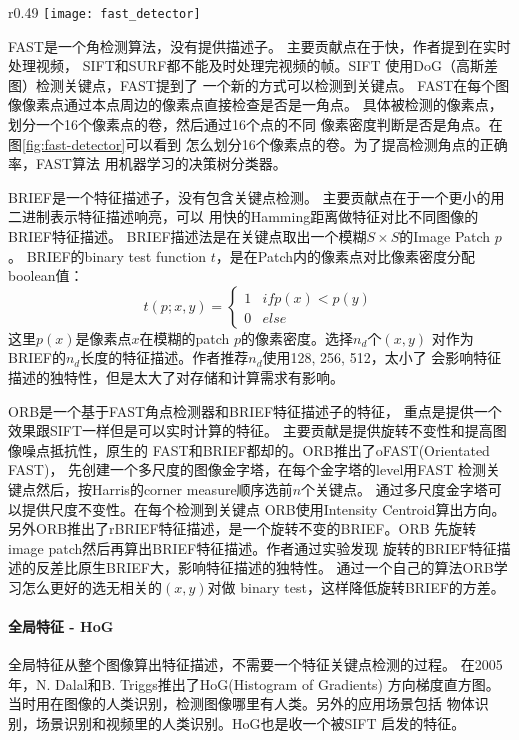 \clearpage
\begin{wrapfigure}{r}{0.49\textwidth}
  \centering
    \texttt{[image: fast\_detector]}
    \caption{FAST检测角点做法。\cite{fast2006machine}}
  \label{fig:fast-detector}
\end{wrapfigure}

FAST是一个角检测算法，没有提供描述子。
主要贡献点在于快，作者提到在实时处理视频，
SIFT和SURF都不能及时处理完视频的帧。SIFT
使用DoG（高斯差图）检测关键点，FAST提到了
一个新的方式可以检测到关键点。
FAST在每个图像像素点通过本点周边的像素点直接检查是否是一角点。
具体被检测的像素点，划分一个16个像素点的卷，然后通过16个点的不同
像素密度判断是否是角点。在图\ref{fig:fast-detector}可以看到
怎么划分16个像素点的卷。为了提高检测角点的正确率，FAST算法
用机器学习的决策树分类器。

BRIEF是一个特征描述子，没有包含关键点检测。\cite{calonder2010brief}
主要贡献点在于一个更小的用二进制表示特征描述响亮，可以
用快的Hamming距离做特征对比不同图像的BRIEF特征描述。
BRIEF描述法是在关键点取出一个模糊$S \times S$的Image Patch $p$。
BRIEF的binary test function $t$，是在Patch内的像素点对比像素密度分配boolean值：
$$
t(p; x, y) = \begin{cases} 
      1 & if p(x) < p(y) \\
      0 & else 
 \end{cases}
$$
这里$p(x)$是像素点$x$在模糊的patch $p$的像素密度。选择$n_d$个$(x, y)$
对作为BRIEF的$n_d$长度的特征描述。作者推荐$n_d$使用128, 256, 512，太小了
会影响特征描述的独特性，但是太大了对存储和计算需求有影响。

ORB是一个基于FAST角点检测器和BRIEF特征描述子的特征，
重点是提供一个效果跟SIFT一样但是可以实时计算的特征。
主要贡献是提供旋转不变性和提高图像噪点抵抗性，原生的
FAST和BRIEF都却的。ORB推出了oFAST(Orientated FAST)，
先创建一个多尺度的图像金字塔，在每个金字塔的level用FAST
检测关键点然后，按Harris的corner measure顺序选前$n$个关键点。
通过多尺度金字塔可以提供尺度不变性。在每个检测到关键点
ORB使用Intensity Centroid算出方向。
另外ORB推出了rBRIEF特征描述，是一个旋转不变的BRIEF。ORB
先旋转image patch然后再算出BRIEF特征描述。作者通过实验发现
旋转的BRIEF特征描述的反差比原生BRIEF大，影响特征描述的独特性。
通过一个自己的算法ORB学习怎么更好的选无相关的$(x, y)$对做
binary test，这样降低旋转BRIEF的方差。


\paragraph{全局特征 - HoG}
全局特征从整个图像算出特征描述，不需要一个特征关键点检测的过程。
在2005年，N. Dalal和B. Triggs推出了HoG(Histogram of Gradients)
方向梯度直方图。\cite{dalal2005histograms}
当时用在图像的人类识别，检测图像哪里有人类。另外的应用场景包括
物体识别，场景识别和视频里的人类识别。HoG也是收一个被SIFT
启发的特征。

